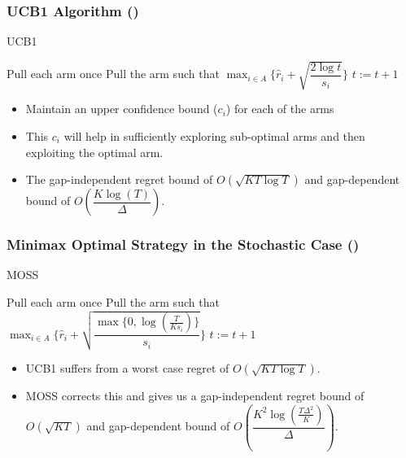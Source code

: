 \begin{frame}
\frametitle{UCB1 Algorithm (\cite{auer2002finite})}
\begin{algorithm}[H]
\caption{UCB1}
\begin{algorithmic}[1]
\State Pull each arm once
\State Pull the arm such that $\max_{i\in A}\bigg\lbrace\hat{r}_{i} + \sqrt{\dfrac{2\log t}{s_i}}\bigg\rbrace$
\State $t:=t+1 $
 \EndFor
\end{algorithmic}
\end{algorithm}

\begin{itemize}
\item<1-> Maintain an upper confidence bound ($c_i$) for each of the arms
\item<1-> This $c_i$ will help in sufficiently exploring sub-optimal arms and then exploiting the optimal arm.
\item<1-> The gap-independent regret bound of $O\left( \sqrt{KT\log T}\right) $ and gap-dependent bound of $O\left( \dfrac{K \log (T)}{\Delta} \right)$.
\end{itemize}
\end{frame}

\begin{frame}
\frametitle{Minimax Optimal Strategy in the Stochastic Case (\cite{audibert2009minimax})}
\begin{algorithm}[H]
\caption{MOSS}
\begin{algorithmic}[1]
\State Pull each arm once
\State Pull the arm such that $\max_{i\in A}\bigg\lbrace\hat{r}_{i} + \sqrt{\dfrac{\max\lbrace 0,\log(\frac{T}{K s_i})\rbrace}{s_i}}\bigg\rbrace$
\State $t:=t+1 $
 \EndFor
\end{algorithmic}
\end{algorithm}
\begin{itemize}
\item<1-> UCB1 suffers from a worst case regret of $O\left( \sqrt{KT\log T }\right) $.
\item<1-> MOSS corrects this and gives us a gap-independent regret bound of $O\left( \sqrt{KT}\right)$ and gap-dependent bound of $O\left( \dfrac{K^2 \log (\frac{T\Delta^2}{K})}{\Delta}\right)$.
\end{itemize}
\end{frame}

